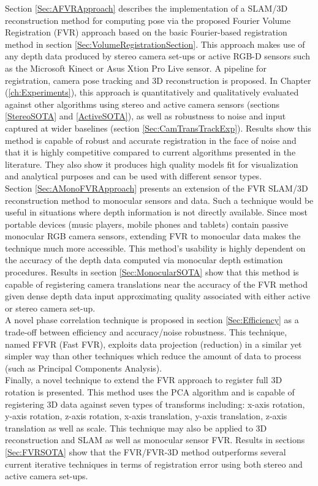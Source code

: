 Section \ref{Sec:AFVRApproach} describes the implementation of a SLAM/3D reconstruction method for computing pose via the proposed Fourier Volume Registration (FVR) approach based on the basic Fourier-based registration method in section \ref{Sec:VolumeRegistrationSection}. This approach makes use of any depth data produced by stereo camera set-ups or active RGB-D sensors such as the Microsoft Kinect or Asus Xtion Pro Live sensor. A pipeline for registration, camera pose tracking and 3D reconstruction is proposed. In Chapter (\ref{ch:Experiments}), this approach is quantitatively and qualitatively evaluated against other algorithms using stereo and active camera sensors (sections \ref{StereoSOTA} and \ref{ActiveSOTA}), as well as robustness to noise and input captured at wider baselines (section \ref{Sec:CamTransTrackExp}). Results show this method is capable of robust and accurate registration in the face of noise and that it is highly competitive compared to current algorithms presented in the literature. They also show it produces high quality models fit for visualization and analytical purposes and can be used with different sensor types.  \\

Section \ref{Sec:AMonoFVRApproach} presents an extension of the FVR SLAM/3D reconstruction method to monocular sensors and data. Such a technique would be useful in situations where depth information is not directly available. Since most portable devices (music players, mobile phones and tablets) contain passive monocular RGB camera sensors, extending FVR to monocular data makes the technique much more accessible. This method's usability is highly dependent on the accuracy of the depth data computed via monocular depth estimation procedures. Results in section \ref{Sec:MonocularSOTA} show that this method is capable of registering camera translations near the accuracy of the FVR method given dense depth data input approximating quality associated with either active or stereo camera set-up.  \\

A novel phase correlation technique is proposed in section \ref{Sec:Efficiency} as a trade-off between efficiency and accuracy/noise robustness. This technique, named FFVR (Fast FVR), exploits data projection (reduction) in a similar yet simpler way than other techniques which reduce the amount of data to process (such as Principal Components Analysis). \\

Finally, a novel technique to extend the FVR approach to register full 3D rotation is presented. This method uses the PCA algorithm and is capable of registering 3D data against seven types of transforms including: x-axis rotation, y-axis rotation, z-axis rotation, x-axis translation, y-axis translation, z-axis translation as well as scale. This technique may also be applied to 3D reconstruction and SLAM as well as monocular sensor FVR. Results in sections \ref{Sec:FVRSOTA} show that the FVR/FVR-3D method outperforms several current iterative techniques in terms of registration error using both stereo and active camera set-ups.  \\